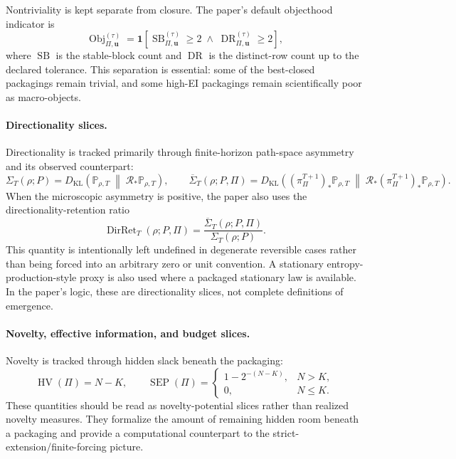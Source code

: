 \documentclass[11pt]{article}
\theoremstyle{definition}
\begin{document}
Nontriviality is kept separate from closure. The paper's default objecthood indicator is
\[
\operatorname{Obj}_{\Pi,\mathbf{u}}^{(\tau)}
=
\mathbf{1}\!\left[
\operatorname{SB}_{\Pi,\mathbf{u}}^{(\tau)}\ge 2
\;\wedge\;
\operatorname{DR}_{\Pi,\mathbf{u}}^{(\tau)}\ge 2
\right],
\]
where $\operatorname{SB}$ is the stable-block count and $\operatorname{DR}$ is the distinct-row count up to the declared tolerance. This separation is essential: some of the best-closed packagings remain trivial, and some high-EI packagings remain scientifically poor as macro-objects.

\paragraph{Directionality slices.}
Directionality is tracked primarily through finite-horizon path-space asymmetry and its observed counterpart:
\[
\Sigma_{T}(\rho;P)
=
D_{\mathrm{KL}}\!\left(
\mathbb{P}_{\rho,T}
\;\middle\|\;
\mathcal{R}_{*}\mathbb{P}_{\rho,T}
\right),
\qquad
\overline{\Sigma}_{T}(\rho;P,\Pi)
=
D_{\mathrm{KL}}\!\left(
(\pi_{\Pi}^{T+1})_{*}\mathbb{P}_{\rho,T}
\;\middle\|\;
\mathcal{R}_{*}(\pi_{\Pi}^{T+1})_{*}\mathbb{P}_{\rho,T}
\right).
\]
When the microscopic asymmetry is positive, the paper also uses the directionality-retention ratio
\[
\operatorname{DirRet}_{T}(\rho;P,\Pi)
=
\frac{\overline{\Sigma}_{T}(\rho;P,\Pi)}{\Sigma_{T}(\rho;P)}.
\]
This quantity is intentionally left undefined in degenerate reversible cases rather than being forced into an arbitrary zero or unit convention. A stationary entropy-production-style proxy is also used where a packaged stationary law is available. In the paper's logic, these are directionality slices, not complete definitions of emergence.

\paragraph{Novelty, effective information, and budget slices.}
Novelty is tracked through hidden slack beneath the packaging:
\[
\operatorname{HV}(\Pi)=N-K,
\qquad
\operatorname{SEP}(\Pi)
=
\begin{cases}
1-2^{-(N-K)}, & N>K,\\
0, & N\le K.
\end{cases}
\]
These quantities should be read as novelty-potential slices rather than realized novelty measures. They formalize the amount of remaining hidden room beneath a packaging and provide a computational counterpart to the strict-extension/finite-forcing picture.
\end{document}
